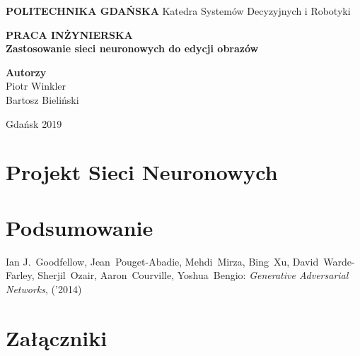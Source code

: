 \documentclass[12pt]{article}
\begin{document}



\begin{titlepage}
  \begin{center}

    \vspace*{1cm}
    \Huge
    \textbf{POLITECHNIKA GDAŃSKA}
    \vspace{0.5cm}
    \LARGE
    Katedra Systemów Decyzyjnych i Robotyki

    \vspace{1.5cm}
    \textbf{PRACA INŻYNIERSKA}
    \\[0.5cm]
    \textbf{Zastosowanie sieci neuronowych do edycji obrazów}

    \vspace{2.5cm}
    \Large
    \textbf{Autorzy}\\
    Piotr Winkler\\
    Bartosz Bieliński

    \vspace{3.5cm}
    Gdańsk 2019

  \end{center}
\end{titlepage}

\setcounter{page}{2}







\newpage
  \tableofcontents





\section{Projekt Sieci Neuronowych}

\section{Podsumowanie}


\newpage
\begin{thebibliography}{99} %
   Ian J.~Goodfellow, Jean~Pouget-Abadie, Mehdi~Mirza, Bing~Xu, David~Warde-Farley, Sherjil~Ozair, Aaron~Courville, Yoshua~Bengio:
  \emph{Generative Adversarial Networks}, ('2014)
\end{thebibliography}

\section{Załączniki}
\end{document}

